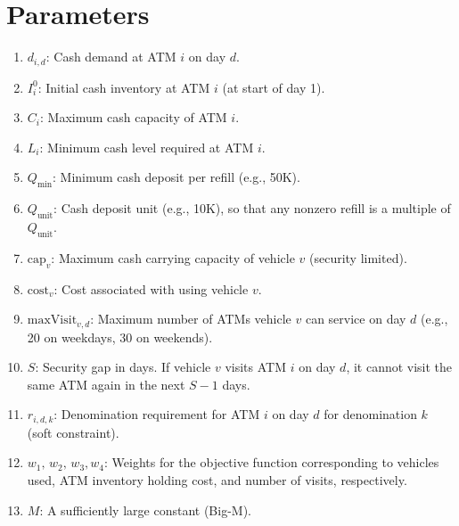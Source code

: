 \documentclass[11pt]{article}
\begin{document}
\section*{Parameters}
\begin{enumerate}[leftmargin=1.5cm]
    \item \(\displaystyle d_{i,d}\): Cash demand at ATM \(i\) on day \(d\).
    \item \(\displaystyle I_i^0\): Initial cash inventory at ATM \(i\) (at start of day 1).
    \item \(\displaystyle C_i\): Maximum cash capacity of ATM \(i\).
    \item \(\displaystyle L_i\): Minimum cash level required at ATM \(i\).
    \item \(\displaystyle Q_{\min}\): Minimum cash deposit per refill (e.g., 50K).
    \item \(\displaystyle Q_{\text{unit}}\): Cash deposit unit (e.g., 10K), so that any nonzero refill is a multiple of \(Q_{\text{unit}}\).
    \item \(\displaystyle \text{cap}_v\): Maximum cash carrying capacity of vehicle \(v\) (security limited).
    \item \(\displaystyle \text{cost}_v\): Cost associated with using vehicle \(v\).
    \item \(\displaystyle \text{maxVisit}_{v,d}\): Maximum number of ATMs vehicle \(v\) can service on day \(d\) (e.g., 20 on weekdays, 30 on weekends).
    \item \(\displaystyle S\): Security gap in days. If vehicle \(v\) visits ATM \(i\) on day \(d\), it cannot visit the same ATM again in the next \(S-1\) days.
    \item \(\displaystyle r_{i,d,k}\): Denomination requirement for ATM \(i\) on day \(d\) for denomination \(k\) (soft constraint).
    \item \(\displaystyle w_1,\, w_2,\, w_3, w_4\): Weights for the objective function corresponding to vehicles used, ATM inventory holding cost, and number of visits, respectively.
    \item \(\displaystyle M\): A sufficiently large constant (Big-M).
\end{enumerate}
\end{document}
